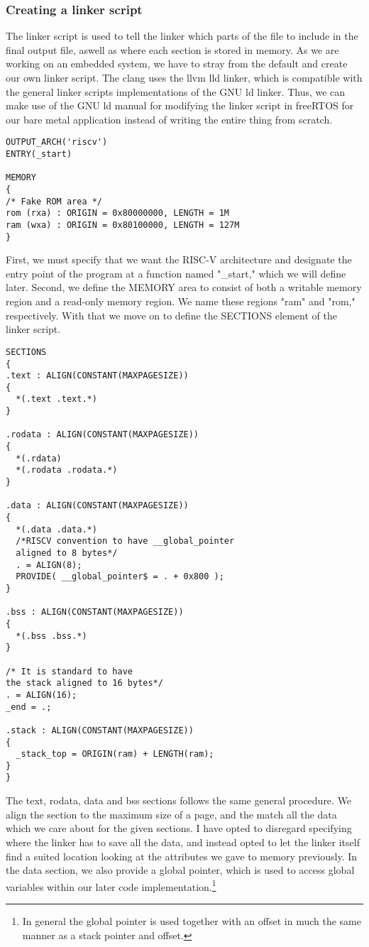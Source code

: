 \subsubsection{Creating a linker script}
The linker script is used to tell the linker which parts of the file to include
in the final output file, aswell as where each section is stored in memory. As
we are working on an embedded system, we have to stray from the default and
create our own linker script. The clang uses the llvm lld linker, which is compatible
with the general linker scripts implementations of the GNU ld linker\cite{llvm-org-linker}.
Thus, we can make use of the GNU ld manual for modifying the linker script in freeRTOS for our bare metal application instead of writing the entire thing from scratch\cite{GNU-linker}.

\begin{lstlisting}
OUTPUT_ARCH('riscv')
ENTRY(_start)

MEMORY
{
/* Fake ROM area */
rom (rxa) : ORIGIN = 0x80000000, LENGTH = 1M
ram (wxa) : ORIGIN = 0x80100000, LENGTH = 127M
}
\end{lstlisting}
First, we must specify that we want the RISC-V architecture and designate the entry point
of the program at a function named "\_start," which we will define later.
Second, we define the MEMORY area to consist of both a writable memory region and a read-only
memory region. We name these regions "ram" and "rom," respectively. With that we move on to define the SECTIONS element of the linker script.

\begin{lstlisting}
SECTIONS
{
.text : ALIGN(CONSTANT(MAXPAGESIZE))
{
  *(.text .text.*)
}

.rodata : ALIGN(CONSTANT(MAXPAGESIZE))
{
  *(.rdata)
  *(.rodata .rodata.*)
}

.data : ALIGN(CONSTANT(MAXPAGESIZE))
{
  *(.data .data.*)
  /*RISCV convention to have __global_pointer
  aligned to 8 bytes*/
  . = ALIGN(8);
  PROVIDE( __global_pointer$ = . + 0x800 );
}

.bss : ALIGN(CONSTANT(MAXPAGESIZE))
{
  *(.bss .bss.*)
}

/* It is standard to have
the stack aligned to 16 bytes*/
. = ALIGN(16);
_end = .;

.stack : ALIGN(CONSTANT(MAXPAGESIZE))
{
  _stack_top = ORIGIN(ram) + LENGTH(ram);
}
}
\end{lstlisting}
The text, rodata, data and bss sections follows the same general procedure. We align the
section to the maximum size of a page, and the match all the data which we care about for
the given sections. I have opted to disregard specifying where the linker has to save
all the data, and instead opted to let the linker itself find a suited location looking at
the attributes we gave to memory previously.
In the data section, we also provide a global pointer, which is used to access global variables
within our later code implementation.\footnote{In general the global pointer is used together
with an offset in much the same manner as a stack pointer and offset.}

